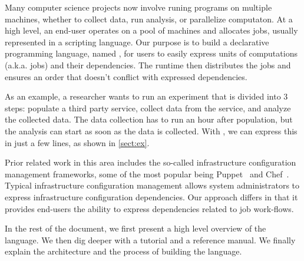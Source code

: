 
Many computer science projects now involve runing programs on multiple machines, whether to collect data, run analysis, or parallelize computaton.
At a high level, an end-user operates on a pool of machines and allocates jobs, usually represented in a scripting language.
Our purpose is to build a declarative programming language, named \lang{}, for users to easily express units of computations (a.k.a. jobs) and their dependencies.
The runtime then distributes the jobs and ensures an order that doesn't conflict with expressed dependencies.

As an example, a researcher wants to run an experiment that is divided into 3 steps: populate a third party service, collect data from the service, and analyze the collected data.
The data collection has to run an hour after population, but the analysis can start as soon as the data is collected.
With \lang{}, we can express this in just a few lines, as shown in \ref{sect:ex}.

Prior related work in this area includes the so-called infrastructure
configuration management frameworks, some of the most popular being
Puppet~\cite{puppet} and Chef~\cite{chef}. Typical infrastructure
configuration management allows system administrators to express
infrastructure configuration dependencies. Our approach differs in that
it provides end-users the ability to express dependencies related to
job work-flows.

In the rest of the document, we first present a high level overview of the language.
We then dig deeper with a tutorial and a reference manual.
We finally explain the architecture and the process of building the language.

